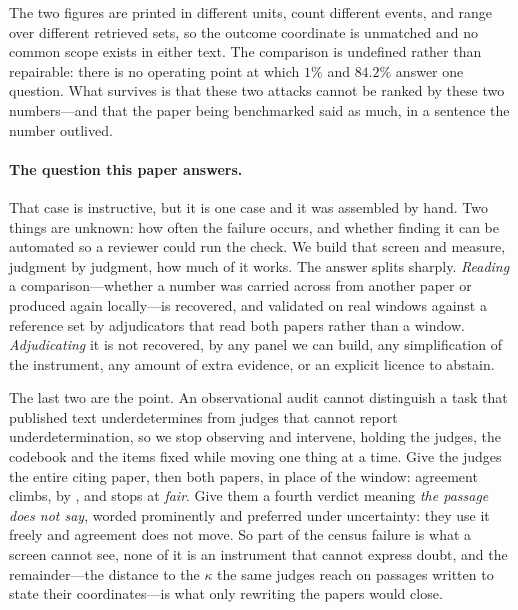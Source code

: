 \documentclass[11pt]{article}
\begin{document}
The two figures are printed in different units, count different events, and
range over different retrieved sets, so the outcome coordinate is unmatched and
no common scope exists in either text. The comparison is undefined rather than
repairable: there is no operating point at which $1\%$ and $84.2\%$ answer one
question. What survives is that these two attacks cannot be ranked by these two
numbers---and that the paper being benchmarked said as much, in a sentence the
number outlived.

\paragraph{The question this paper answers.}
That case is instructive, but it is one case and it was assembled by hand. Two
things are unknown: how often the failure occurs, and whether finding it can be
automated so a reviewer could run the check. We build that screen and measure,
judgment by judgment, how much of it works. The answer splits sharply.
\emph{Reading} a comparison---whether a number was carried across from another
paper or produced again locally---is recovered, and validated on real windows
against a reference set by adjudicators that read both papers rather than a
window. \emph{Adjudicating} it is not recovered, by any panel we can build, any
simplification of the instrument, any amount of extra evidence, or an explicit
licence to abstain.

The last two are the point. An observational audit cannot distinguish a task
that published text underdetermines from judges that cannot report
underdetermination, so we stop observing and intervene, holding the judges, the
codebook and the items fixed while moving one thing at a time. Give the judges
the entire citing paper, then both papers, in place of the window: agreement
climbs, by \LadVdDeltaCite{} \LadVdDeltaCiteCI{}, and stops at \emph{fair}. Give
them a fourth verdict meaning \emph{the passage does not say}, worded
prominently and preferred under uncertainty: they use it freely and agreement
does not move. So part of the census failure is what a screen cannot see, none
of it is an instrument that cannot express doubt, and the remainder---the
distance to the $\kappa$ \InsFullK{} the same judges reach on passages written
to state their coordinates---is what only rewriting the papers would close.
\end{document}
